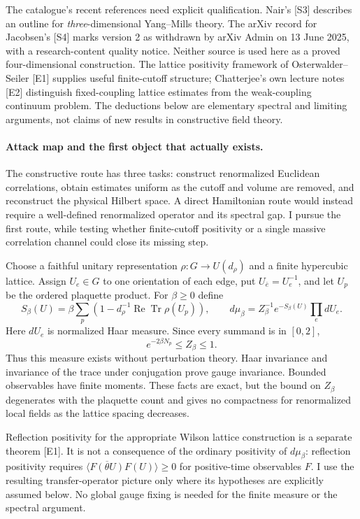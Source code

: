 \documentclass[11pt]{article}
\begin{document}
The catalogue's recent references need explicit qualification. Nair's [S3]
 describes an outline for \emph{three}-dimensional Yang--Mills theory. The arXiv
 record for Jacobsen's [S4] marks version 2 as withdrawn by arXiv Admin on
 13 June 2025, with a research-content quality notice. Neither source is used
 here as a proved four-dimensional construction. The lattice positivity
 framework of Osterwalder--Seiler [E1] supplies useful finite-cutoff structure;
 Chatterjee's own lecture notes [E2] distinguish fixed-coupling lattice
 estimates from the weak-coupling continuum problem. The deductions below
 are elementary spectral and limiting arguments, not claims of new results
 in constructive field theory.

\paragraph{Attack map and the first object that actually exists.}
The constructive route has three tasks: construct renormalized Euclidean
 correlations, obtain estimates uniform as the cutoff and volume are removed,
 and reconstruct the physical Hilbert space. A direct Hamiltonian route would
 instead require a well-defined renormalized operator and its spectral gap.
 I pursue the first route, while testing whether finite-cutoff positivity or
 a single massive correlation channel could close its missing step.

Choose a faithful unitary representation $\rho:G\to U(d_\rho)$ and a finite
 hypercubic lattice. Assign $U_e\in G$ to one orientation of each edge, put
 $U_{\bar e}=U_e^{-1}$, and let $U_p$ be the ordered plaquette product. For
 $\beta\geq0$ define
\[
 S_\beta(U)=\beta\sum_p
 \left(1-d_\rho^{-1}\operatorname{Re}\operatorname{Tr}\rho(U_p)\right),
 \qquad d\mu_\beta=Z_\beta^{-1}e^{-S_\beta(U)}\prod_e dU_e.
\]
Here $dU_e$ is normalized Haar measure. Since every summand is in $[0,2]$,
\[
 e^{-2\beta N_p}\leq Z_\beta\leq1.
\]
Thus this measure exists without perturbation theory. Haar invariance and
 invariance of the trace under conjugation prove gauge invariance. Bounded
 observables have finite moments. These facts are exact, but the bound on
 $Z_\beta$ degenerates with the plaquette count and gives no compactness for
 renormalized local fields as the lattice spacing decreases.

Reflection positivity for the appropriate Wilson lattice construction is a
 separate theorem [E1]. It is not a consequence of the ordinary positivity
 of $d\mu_\beta$: reflection positivity requires
 $\langle\overline{F(\theta U)}F(U)\rangle\geq0$ for positive-time observables
 $F$. I use the resulting transfer-operator picture only where its
 hypotheses are explicitly assumed below. No global gauge fixing is needed
 for the finite measure or the spectral argument.
\end{document}
